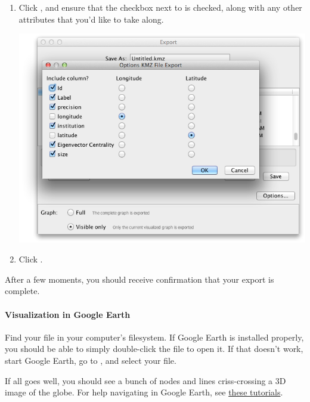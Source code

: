 \documentclass[letterpaper,10pt,english]{sphinxmanual}
\begin{document}
\begin{enumerate}
\item {} 
Click , and ensure that the checkbox next to  is checked, along
with any other attributes that you'd like to take along.

{\hfill\includegraphics{geo12.png}\hfill}

\item {} 
Click .

\end{enumerate}

After a few moments, you should receive confirmation that your export is complete.


\paragraph{Visualization in Google Earth}
\label{tutorial.geonetworks:visualization-in-google-earth}
Find your  file in your computer's filesystem. If Google Earth is installed
properly, you should be able to simply double-click the file to open it. If that doesn't
work, start Google Earth, go to , and select your  file.

If all goes well, you should see a bunch of nodes and lines criss-crossing a 3D image of
the globe. For help navigating in Google Earth, see \href{http://www.google.com/earth/learn/}{these tutorials}.
\end{document}
